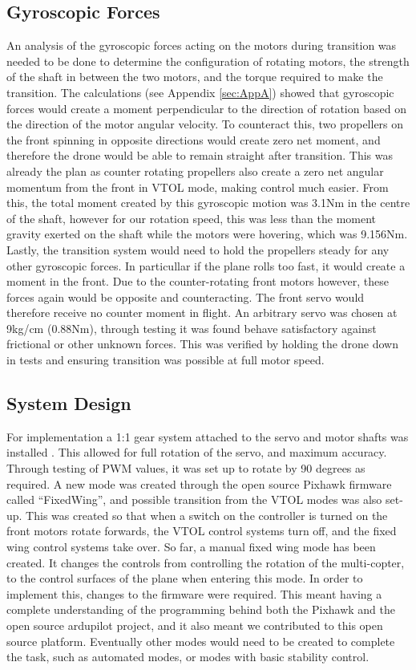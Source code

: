 \subsection{Gyroscopic Forces}
An analysis of the gyroscopic forces acting on the motors during transition was needed to be done to determine the configuration of rotating motors, the strength of the shaft in between the two motors, and the torque required to make the transition. The calculations (see Appendix \ref{sec:AppA}) showed that gyroscopic forces would create a moment perpendicular to the direction of rotation based on the direction of the motor angular velocity. To counteract this, two propellers on the front spinning in opposite directions would create zero net moment, and therefore the drone would be able to remain straight after transition. This was already the plan as counter rotating propellers also create a zero net angular momentum from the front in VTOL mode, making control much easier.  From this, the total moment created by this gyroscopic motion was 3.1Nm in the centre of the shaft, however for our rotation speed, this was less than the moment gravity exerted on the shaft while the motors were hovering, which was 9.156Nm. Lastly, the transition system would need to hold the propellers steady for any other gyroscopic forces. In particullar if the plane rolls too fast, it would create a moment in the front. Due to the counter-rotating front motors however, these forces again would be opposite and counteracting. The front servo would therefore receive no counter moment in flight. An arbitrary servo was chosen at 9kg/cm (0.88Nm), through testing it was found behave satisfactory against frictional or other unknown forces. This was verified by holding the drone down in tests and ensuring transition was possible at full motor speed.

\subsection{System Design}
For implementation a 1:1 gear system attached to the servo and motor shafts was installed . This allowed for full rotation of the servo, and maximum accuracy.  Through testing of PWM values, it was set up to rotate by 90 degrees as required. A new mode was created through the open source Pixhawk firmware called “FixedWing”, and possible transition from the VTOL modes was also set-up. This was created so that when a switch on the controller is turned on the front motors rotate forwards, the VTOL control systems turn off, and the fixed wing control systems take over. So far, a manual fixed wing mode has been created. It changes the controls from controlling the rotation of the multi-copter, to the control surfaces of the plane when entering this mode. In order to implement this, changes to the firmware were required.  This meant having  a complete understanding of the programming behind both the Pixhawk and the open source ardupilot project, and it also meant we contributed to this open source platform. Eventually other modes would need to be created to complete the task, such as automated modes, or modes with basic stability control.\\ 

